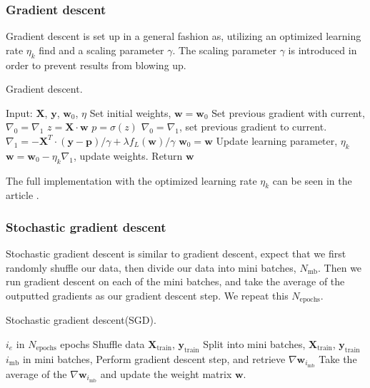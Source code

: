 \subsubsection{Gradient descent}
Gradient descent is set up in a general fashion as, utilizing an optimized learning rate $\eta_k$ find and a scaling parameter $\gamma$. The scaling parameter $\gamma$ is introduced in order to prevent results from blowing up.
\begin{algorithm}[H]
    \caption{Gradient descent.}
    \label{alg:gd}
    \begin{algorithmic}[1]
        \State Input: $\bm{X}$, $\bm{y}$, $\bm{w}_0$, $\eta$
        \State Set initial weights, $\bm{w} = \bm{w}_0$
        \State Set previous gradient with current, $\nabla_0 = \nabla_1$
            \State $z = \bm{X}\cdot \bm{w}$
            \State $p = \sigma(z)$
            \State $\nabla_0 = \nabla_1$, set previous gradient to current.
            \State $\nabla_1 = - \bm{X}^T \cdot (\bm{y} - \bm{p}) / \gamma + \lambda f_L(\bm{w}) / \gamma$
            \State $\bm{w}_0 = \bm{w}$
            \State Update learning parameter, $\eta_k$
            \State $\bm{w} = \bm{w}_0 - \eta_k \nabla_1$, update weights.
        \EndWhile
        \State Return $\bm{w}$
    \end{algorithmic}
\end{algorithm}
The full implementation with the optimized learning rate $\eta_k$ can be seen in the article \citet{optimal-learning-rate}.

\subsubsection{Stochastic gradient descent}
Stochastic gradient descent is similar to gradient descent, expect that we first randomly shuffle our data, then divide our data into mini batches, $N_\mathrm{mb}$. Then we run gradient descent on each of the mini batches, and take the average of the outputted gradients as our gradient descent step. We repeat this $N_\mathrm{epochs}$.
\begin{algorithm}[H]
    \caption{Stochastic gradient descent(SGD).}
    \label{alg:sgd}
    \begin{algorithmic}[1]
        \For $i_e$ in $N_\mathrm{epochs}$ epochs
            \State Shuffle data $\bm{X}_\mathrm{train}$, $\bm{y}_\mathrm{train}$
            \State Split into mini batches, $\bm{X}_\mathrm{train}$, $\bm{y}_\mathrm{train}$
            \For $i_\mathrm{mb}$ in mini batches,
                \State Perform gradient descent step, and retrieve $\nabla\bm{w}_{i_\mathrm{mb}}$
            \EndFor
            \State Take the average of the $\nabla\bm{w}_{i_\mathrm{mb}}$ and update the weight matrix $\bm{w}$.
        \EndFor
    \end{algorithmic}
\end{algorithm}



